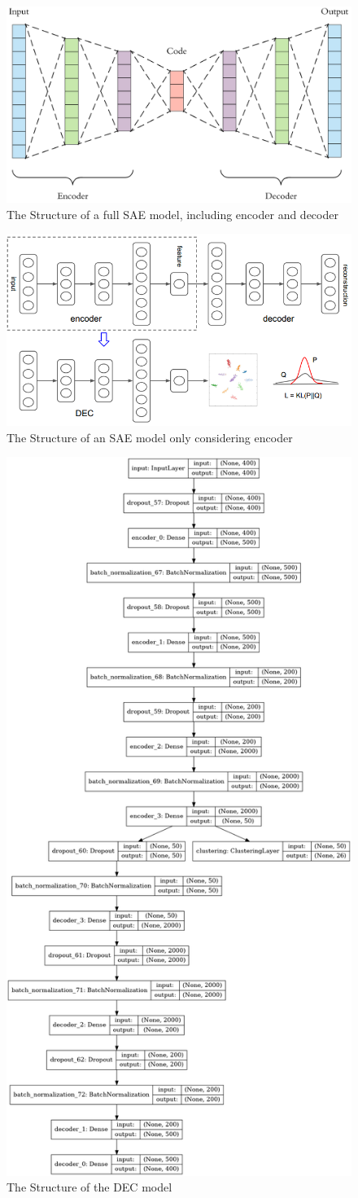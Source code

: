 \documentclass[12pt]{article}
\begin{document}
\begin{figure}[hp]
    \centering
    \includegraphics[width=.6\textwidth]{fig/fullSAEmodel.png}
    \caption{The Structure of a full SAE model, including encoder and decoder}
    \label{fig:fullSAEmodel}
\end{figure}

\begin{figure}[hp]
    \centering
    \includegraphics[width=.6\textwidth]{fig/deep-clustering-model.png}
    \caption{The Structure of an SAE model only considering encoder}
    \label{fig:SAEmodel}
\end{figure}

\begin{figure}[hp]
    \centering
    \includegraphics[width=.6\textwidth]{fig/encoder.png}
    \caption{The Structure of the DEC model}
    \label{fig:DECmodel}
\end{figure}

\clearpage

\singlespacing
\setlength\bibsep{0pt}


\end{document}
